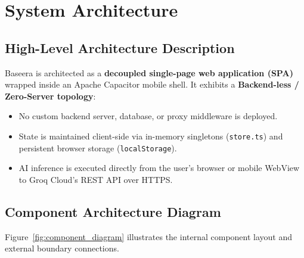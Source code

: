 \documentclass[10pt,a4paper]{report}
\begin{document}
\chapter{System Architecture}

\section{High-Level Architecture Description}
Baseera is architected as a \textbf{decoupled single-page web application (SPA)} wrapped inside an Apache Capacitor mobile shell. It exhibits a \textbf{Backend-less / Zero-Server topology}:
\begin{itemize}[leftmargin=1.5em]
    \item No custom backend server, database, or proxy middleware is deployed.
    \item State is maintained client-side via in-memory singletons (\texttt{store.ts}) and persistent browser storage (\texttt{localStorage}).
    \item AI inference is executed directly from the user's browser or mobile WebView to Groq Cloud's REST API over HTTPS.
\end{itemize}

\section{Component Architecture Diagram}
Figure~\ref{fig:component_diagram} illustrates the internal component layout and external boundary connections.
\end{document}
